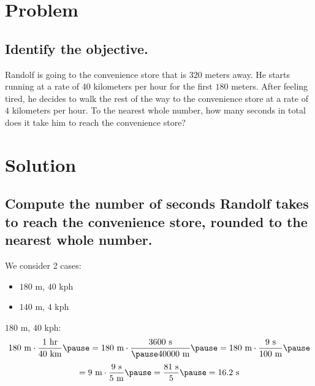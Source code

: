 \documentclass{beamer} %
\begin{document}
\begin{frame} %
  \titlepage
\end{frame}

\section{Problem}

\subsection*{Identify the objective.}

\begin{frame}
  Randolf is going to the convenience store that is $320$ meters away. He starts running at a rate of $40$ kilometers per hour for the first $180$ meters. After feeling tired, he decides to walk the rest of the way to the convenience store at a rate of $4$ kilometers per hour. To the nearest whole number, how many seconds in total does it take him to reach the convenience store?
\end{frame}

\section{Solution}

\subsection*{Compute the number of seconds Randolf takes to reach the convenience store, rounded to the nearest whole number.}

\begin{frame}
  We consider 2 cases:\pause
  \begin{itemize}
    \item $180$ m, $40$ kph\pause
    \item $140$ m, $4$ kph
  \end{itemize}
\end{frame}

\begin{frame}
  $180$ m, $40$ kph:
  \pause
  \[180 \text{ m} \cdot \frac{1 \text{ hr}}{40 \text{ km}} \pause = 180 \text{ m} \cdot \frac{3600 \text{ s}}{\pause 40000 \text{ m}} \pause = 180 \text{ m} \cdot \frac{9 \text{ s}}{100 \text{ m}} \pause\]
  \[= 9 \text{ m} \cdot \frac{9 \text{ s}}{5 \text{ m}} \pause = \frac{81 \text{ s}}{5} \pause = 16.2 \text{ s}\]
\end{frame}
\begin{comment}
\[18 \cdot \cancel{10 \text{ m}} \cdot \frac{36 \cdot \cancel{100} \text{ s}}{40 \cdot \cancel{10} \cdot \cancel{100 \text{ m}}}\]
\end{comment}
\end{document}
